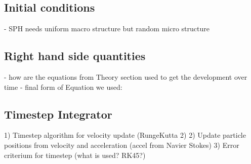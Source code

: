 \subsection{Initial conditions}
- SPH needs uniform macro structure but random micro structure


\subsection{Right hand side quantities}
- how are the equations from Theory section used to get the development over time
- final form of Equation we used:


\subsection{Timestep Integrator}
1) Timestep algorithm for velocity update (RungeKutta 2)
2) Update particle positions from velocity and acceleration (accel from Navier Stokes)
3) Error criterium for timestep (what is used? RK45?)

